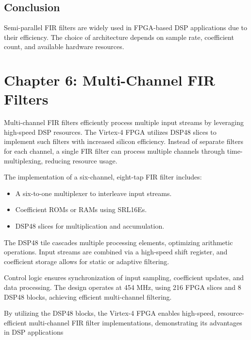 \documentclass{article}
\begin{document}
	\subsection{Conclusion}
	Semi-parallel FIR filters are widely used in FPGA-based DSP applications due to their efficiency. The choice of architecture depends on sample rate, coefficient count, and available hardware resources.
	
	
	\section{Chapter 6: Multi-Channel FIR Filters}
	Multi-channel FIR filters efficiently process multiple input streams by leveraging high-speed DSP resources. The Virtex-4 FPGA utilizes DSP48 slices to implement such filters with increased silicon efficiency. Instead of separate filters for each channel, a single FIR filter can process multiple channels through time-multiplexing, reducing resource usage.
	
	The implementation of a six-channel, eight-tap FIR filter includes:
	\begin{itemize}
		\item A six-to-one multiplexer to interleave input streams.
		\item Coefficient ROMs or RAMs using SRL16Es.
		\item DSP48 slices for multiplication and accumulation.
	\end{itemize}
	
	The DSP48 tile cascades multiple processing elements, optimizing arithmetic operations. Input streams are combined via a high-speed shift register, and coefficient storage allows for static or adaptive filtering.
	
	Control logic ensures synchronization of input sampling, coefficient updates, and data processing. The design operates at 454 MHz, using 216 FPGA slices and 8 DSP48 blocks, achieving efficient multi-channel filtering.
	
	By utilizing the DSP48 blocks, the Virtex-4 FPGA enables high-speed, resource-efficient multi-channel FIR filter implementations, demonstrating its advantages in DSP applications
	
\end{document}
